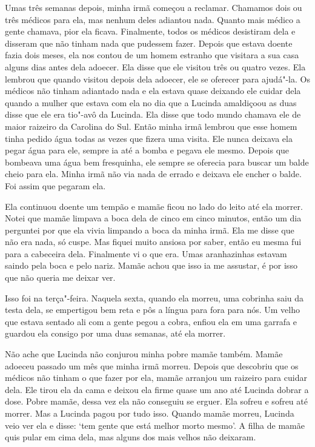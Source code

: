 Umas três semanas depois, minha irmã começou a reclamar. Chamamos dois
ou três médicos para ela, mas nenhum deles adiantou nada. Quanto mais
médico a gente chamava, pior ela ficava. Finalmente, todos os médicos
desistiram dela e disseram que não tinham nada que pudessem fazer.
Depois que estava doente fazia dois meses, ela nos contou de um homem
estranho que visitara a sua casa alguns dias antes dela adoecer. Ela
disse que ele visitou três ou quatro vezes. Ela lembrou que quando
visitou depois dela adoecer, ele se oferecer para ajudá"-la. Os médicos %
não tinham adiantado nada e ela estava quase deixando ele cuidar dela
quando a mulher que estava com ela no dia que a Lucinda amaldiçoou as
duas disse que ele era tio"-avô da Lucinda. Ela disse que todo mundo
chamava ele de maior raizeiro da Carolina do Sul. Então minha irmã
lembrou que esse homem tinha pedido água todas as vezes que fizera uma
visita. Ele nunca deixava ela pegar água para ele, sempre ia até a bomba
e pegava ele mesmo. Depois que bombeava uma água bem fresquinha, ele
sempre se oferecia para buscar um balde cheio para ela. Minha irmã não
via nada de errado e deixava ele encher o balde. Foi assim que pegaram
ela.

Ela continuou doente um tempão e mamãe ficou no lado do leito até ela
morrer. Notei que mamãe limpava a boca dela de cinco em cinco minutos,
então um dia perguntei por que ela vivia limpando a boca da minha irmã.
Ela me disse que não era nada, só cuspe. Mas fiquei muito ansiosa por
saber, então eu mesma fui para a cabeceira dela. Finalmente vi o que
era. Umas aranhazinhas estavam saindo pela boca e pelo nariz. Mamãe
achou que isso ia me assustar, é por isso que não queria me deixar ver.

Isso foi na terça"-feira. Naquela sexta, quando ela morreu, uma cobrinha
saiu da testa dela, se empertigou bem reta e pôs a língua para fora para
nós. Um velho que estava sentado ali com a gente pegou a cobra, enfiou
ela em uma garrafa e guardou ela consigo por uma duas semanas, até ela
morrer.

Não ache que Lucinda não conjurou minha pobre mamãe também. Mamãe
adoeceu passado um mês que minha irmã morreu. Depois que descobriu que
os médicos não tinham o que fazer por ela, mamãe arranjou um raizeiro
para cuidar dela. Ele tirou ela da cama e deixou ela firme quase um ano
até Lucinda dobrar a dose. Pobre mamãe, dessa vez ela não conseguiu se
erguer. Ela sofreu e sofreu até morrer. Mas a Lucinda pagou por tudo
isso. Quando mamãe morreu, Lucinda veio ver ela e disse: `tem gente que
está melhor morto mesmo'. A filha de mamãe quis pular em cima dela, mas
alguns dos mais velhos não deixaram.


